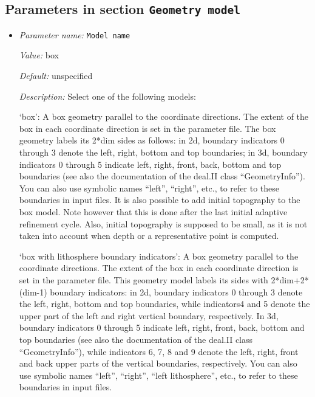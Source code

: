 \subsection{Parameters in section \tt Geometry model}
\label{parameters:Geometry_20model}

\begin{itemize}
\item {\it Parameter name:} {\tt Model name}
\label{parameters:Geometry model/Model name}
\label{parameters:Geometry_20model/Model_20name}


{\it Value:} box


{\it Default:} unspecified


{\it Description:} Select one of the following models:

`box': A box geometry parallel to the coordinate directions. The extent of the box in each coordinate direction is set in the parameter file. The box geometry labels its 2*dim sides as follows: in 2d, boundary indicators 0 through 3 denote the left, right, bottom and top boundaries; in 3d, boundary indicators 0 through 5 indicate left, right, front, back, bottom and top boundaries (see also the documentation of the deal.II class ``GeometryInfo''). You can also use symbolic names ``left'', ``right'', etc., to refer to these boundaries in input files. It is also possible to add initial topography to the box model. Note however that this is done after the last initial adaptive refinement cycle. Also, initial topography is supposed to be small, as it is not taken into account when depth or a representative point is computed. 

`box with lithosphere boundary indicators': A box geometry parallel to the coordinate directions. The extent of the box in each coordinate direction is set in the parameter file. This geometry model labels its sides with 2*dim+2*(dim-1) boundary indicators: in 2d, boundary indicators 0 through 3 denote the left, right, bottom and top boundaries, while indicators4 and 5 denote the upper part of the left and right vertical boundary, respectively. In 3d, boundary indicators 0 through 5 indicate left, right, front, back, bottom and top boundaries (see also the documentation of the deal.II class ``GeometryInfo''), while indicators 6, 7, 8 and 9 denote the left, right, front and back upper parts of the vertical boundaries, respectively. You can also use symbolic names ``left'', ``right'', ``left lithosphere'', etc., to refer to these boundaries in input files.


\end{itemize}

